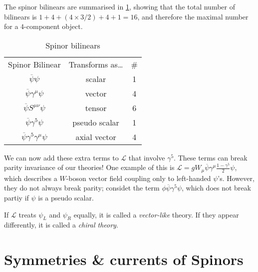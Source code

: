 The spinor bilinears are summarised in \ref{tab:15-1}, showing that the total number of bilinears is $1 + 4 + (4 \times 3 / 2) + 4 + 1 = 16$, and therefore the maximal number for a $4$-component object.

\begin{table}[tbph]
  \centering
  \begin{tabular}{c c c}
    Spinor Bilinear & Transforms as\dots & \#\\
    $\overline{\psi}\psi$ & scalar & 1 \\
    $\overline{\psi} \gamma^{\mu} \psi$ & vector & 4 \\
    $\overline{\psi} S^{\mu\nu} \psi$ & tensor & 6 \\
    $\overline{\psi} \gamma^5\psi$ & pseudo scalar & 1 \\
    $\overline{\psi}\gamma^5 \gamma^{\mu} \psi$ & axial vector & 4 \\
  \end{tabular}
  \caption{Spinor bilinears}
  \label{tab:15-1}
\end{table}

We can now add these extra terms to $\mathcal{L}$ that involve $\gamma^5$. These terms can break parity invariance of our theories!
One example of this is $\mathcal{L} = g W_{\mu} \overline{\psi} \gamma^{\mu} \frac{1 - \gamma^5}{2} \psi$, which describes a $W$-boson vector field coupling only to left-handed $\psi$'s.
However, they do not always break parity; considet the term $\phi \overline{\psi} \gamma^5 \psi$, which does not break partiy if $\psi$ is a pseudo scalar.
\begin{definition}[]
  If $\mathcal{L}$ treats $\psi_L$ and $\psi_R$ equally, it is called a \emph{vector-like} theory. If they appear differently, it is called a \emph{chiral theory}.
\end{definition}

\section{Symmetries \& currents of Spinors}%
\label{sec:symmetries_&_currents_of_spinors}

